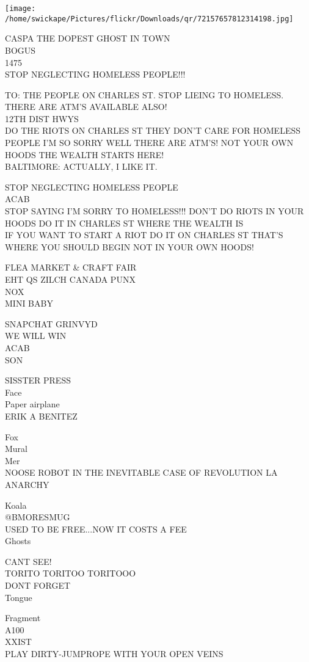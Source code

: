 \documentclass[10pt,letterpaper]{article}
\begin{document}
\texttt{[image: /home/swickape/Pictures/flickr/Downloads/qr/72157657812314198.jpg]}


CASPA THE DOPEST GHOST IN TOWN\\
BOGUS\\
1475\\
STOP NEGLECTING HOMELESS PEOPLE!!!

TO: THE PEOPLE ON CHARLES ST. STOP LIEING TO HOMELESS.  THERE ARE ATM'S AVAILABLE ALSO!\\
12TH DIST HWYS\\
DO THE RIOTS ON CHARLES ST THEY DON'T CARE FOR HOMELESS PEOPLE I'M SO SORRY WELL THERE ARE ATM'S!  NOT YOUR OWN HOODS THE WEALTH STARTS HERE!\\
BALTIMORE: ACTUALLY, I LIKE IT.

STOP NEGLECTING HOMELESS PEOPLE\\
ACAB\\
STOP SAYING I'M SORRY TO HOMELESS!!!  DON'T DO RIOTS IN YOUR HOODS DO IT IN CHARLES ST WHERE THE WEALTH IS\\
IF YOU WANT TO START A RIOT DO IT ON CHARLES ST THAT'S WHERE YOU SHOULD BEGIN NOT IN YOUR OWN HOODS!

FLEA MARKET \& CRAFT FAIR\\
EHT QS ZILCH CANADA PUNX\\
NOX\\
MINI BABY

SNAPCHAT GRINVYD\\
WE WILL WIN\\
ACAB\\
SON

SISSTER PRESS\\
Face\\
Paper airplane\\
ERIK A BENITEZ

Fox\\
Mural\\
Mer\\
NOOSE ROBOT IN THE INEVITABLE CASE OF REVOLUTION LA ANARCHY

Koala\\
@BMORESMUG\\
USED TO BE FREE...NOW IT COSTS A FEE\\
Ghosts

CANT SEE!\\
TORITO TORITOO TORITOOO\\
DONT FORGET\\
Tongue

Fragment\\
A100\\
XXIST\\
PLAY DIRTY{-}JUMPROPE WITH YOUR OPEN VEINS
\end{document}
